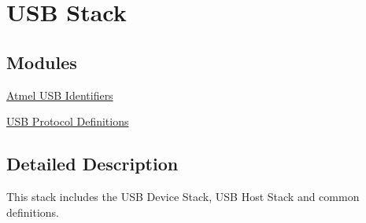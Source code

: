 \hypertarget{group__usb__group}{}\section{U\+SB Stack}
\label{group__usb__group}
\subsection*{Modules}
\begin{DoxyCompactItemize}
\item 
\hyperlink{group__usb__atmel__ids__group}{Atmel U\+S\+B Identifiers}
\item 
\hyperlink{group__usb__protocol__group}{U\+S\+B Protocol Definitions}
\end{DoxyCompactItemize}


\subsection{Detailed Description}
This stack includes the U\+SB Device Stack, U\+SB Host Stack and common definitions. 